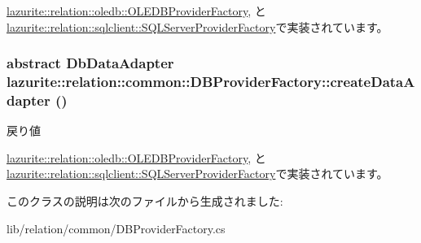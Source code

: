 \hyperlink{classlazurite_1_1relation_1_1oledb_1_1_o_l_e_d_b_provider_factory_a3f9cfbeba5e17982171b58079d9f4067}{lazurite::relation::oledb::OLEDBProviderFactory}, と \hyperlink{classlazurite_1_1relation_1_1sqlclient_1_1_s_q_l_server_provider_factory_aa4c5aa8059304c9ff54addb81f6bf755}{lazurite::relation::sqlclient::SQLServerProviderFactory}で実装されています。\hypertarget{classlazurite_1_1relation_1_1common_1_1_d_b_provider_factory_a7343964afac875d0f5d665879c26f38f}{
\subsubsection[{createDataAdapter}]{\setlength{\rightskip}{0pt plus 5cm}abstract DbDataAdapter lazurite::relation::common::DBProviderFactory::createDataAdapter ()}}
\label{classlazurite_1_1relation_1_1common_1_1_d_b_provider_factory_a7343964afac875d0f5d665879c26f38f}
\begin{DoxyReturn}{戻り値}

\end{DoxyReturn}


\hyperlink{classlazurite_1_1relation_1_1oledb_1_1_o_l_e_d_b_provider_factory_a38fa9d782201330de88cf58b84f16df2}{lazurite::relation::oledb::OLEDBProviderFactory}, と \hyperlink{classlazurite_1_1relation_1_1sqlclient_1_1_s_q_l_server_provider_factory_a7292de2fd61beaba65431210e7910be0}{lazurite::relation::sqlclient::SQLServerProviderFactory}で実装されています。

このクラスの説明は次のファイルから生成されました:\begin{DoxyCompactItemize}
\item 
lib/relation/common/DBProviderFactory.cs\end{DoxyCompactItemize}

